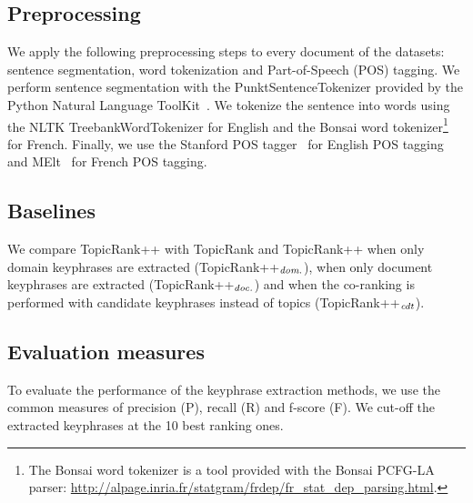   \subsection{Preprocessing}
  \label{subsec:preprocessing}
    We apply the following preprocessing steps to every document of the
    datasets: sentence segmentation, word tokenization and Part-of-Speech (POS)
    tagging. We perform sentence segmentation with the PunktSentenceTokenizer
    provided by the Python Natural Language ToolKit~\cite[NLTK]{bird2009nltk}.
    We tokenize the sentence into words using the NLTK TreebankWordTokenizer for
    English and the Bonsai word tokenizer\footnote{The Bonsai word tokenizer is
    a tool provided with the Bonsai PCFG-LA parser:
    \url{http://alpage.inria.fr/statgram/frdep/fr_stat_dep_parsing.html}.} for
    French. Finally, we use the Stanford POS
    tagger~\cite{toutanova2003stanfordpostagger} for English POS tagging and
    MElt~\cite{denis2009melt} for French POS tagging.

  \subsection{Baselines}
  \label{subsec:baselines}
    We compare TopicRank++ with TopicRank and TopicRank++ when only domain
    keyphrases are extracted (TopicRank++$_\textnormal{\emph{dom.}}$), when only
    document keyphrases are extracted (TopicRank++$_\textnormal{\emph{doc.}}$)
    and when the co-ranking is performed with candidate keyphrases instead of
    topics (TopicRank++$_\textnormal{\emph{cdt}}$).

  \subsection{Evaluation measures}
  \label{subsec:evaluation_measures}
    To evaluate the performance of the keyphrase extraction methods, we use the
    common measures of precision (P), recall (R) and f-score (F). We cut-off the
    extracted keyphrases at the 10 best ranking ones.

